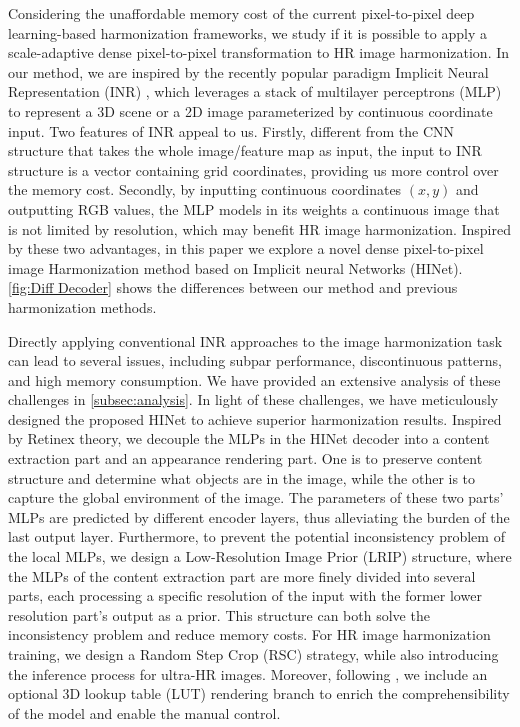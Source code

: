 \documentclass[10pt,journal,twocolumn,twoside]{IEEEtran}
\begin{document}
Considering the unaffordable memory cost of the current pixel-to-pixel deep learning-based harmonization frameworks, we study if it is possible to apply a scale-adaptive dense pixel-to-pixel transformation to HR image harmonization. In our method, we are inspired by the recently popular paradigm Implicit Neural Representation (INR) \cite{sitzmann2020implicit, tancik2020fourier}, which leverages a stack of multilayer perceptrons (MLP) to represent a 3D scene \cite{mildenhall2021nerf} or a 2D image \cite{sitzmann2020implicit} parameterized by continuous coordinate input. Two features of INR appeal to us. Firstly, different from the CNN structure that takes the whole image/feature map as input, the input to INR structure is a vector containing grid coordinates, providing us more control over the memory cost. Secondly, by inputting continuous coordinates $(x, y)$ and outputting RGB values, the MLP models in its weights a continuous image that is not limited by resolution, which may benefit HR image harmonization. Inspired by these two advantages, in this paper we explore a novel dense pixel-to-pixel image Harmonization method based on Implicit neural Networks (HINet). \cref{fig:Diff Decoder} shows the differences between our method and previous harmonization methods. 


Directly applying conventional INR approaches to the image harmonization task can lead to several issues, including subpar performance, discontinuous patterns, and high memory consumption. We have provided an extensive analysis of these challenges in \cref{subsec:analysis}. In light of these challenges, we have meticulously designed the proposed HINet to achieve superior harmonization results. Inspired by Retinex theory\cite{land1971lightness, land1977retinex}, we decouple the MLPs in the HINet decoder into a content extraction part and an appearance rendering part. One is to preserve content structure and determine what objects are in the image, while the other is to capture the global environment of the image. The parameters of these two parts' MLPs are predicted by different encoder layers, thus alleviating the burden of the last output layer. Furthermore, to prevent the potential inconsistency problem of the local MLPs, we design a Low-Resolution Image Prior (LRIP) structure, where the MLPs of the content extraction part are more finely divided into several parts, each processing a specific resolution of the input with the former lower resolution part's output as a prior. This structure can both solve the inconsistency problem and reduce memory costs. For HR image harmonization training, we design a Random Step Crop (RSC) strategy, while also introducing the inference process for ultra-HR images. Moreover, following \cite{ke2022harmonizer, xue2022dccf}, we include an optional 3D lookup table (LUT)\cite{karaimer2016software, zeng2020learning} rendering branch to enrich the comprehensibility of the model and enable the manual control.
\end{document}
